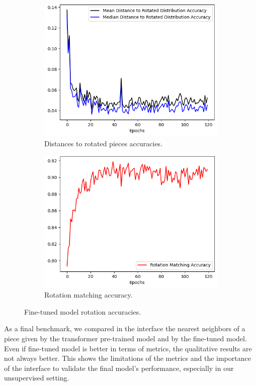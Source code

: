 \begin{figure}[]
    \begin{subfigure}[h]{0.5\linewidth}
        \includegraphics[width=\columnwidth]{images/rotation_metrics_evolution_openshape.png}
        \caption{Distances to rotated pieces accuracies.}
    \end{subfigure}
    \hfill
    \begin{subfigure}[h]{0.5\linewidth}
        \includegraphics[width=\columnwidth]{images/rotation_accuracy_evolution_openshape.png}
        \caption{Rotation matching accuracy.}
    \end{subfigure}
    \caption{Fine-tuned model rotation accuracies.}
    \label{fig:rotation_metrics_evolution_openshape}
\end{figure}

As a final benchmark, we compared in the interface the nearest neighbors of a piece given by the transformer pre-trained model and by the fine-tuned model. Even if fine-tuned model is better in terms of metrics, the qualitative results are not always better. This shows the limitations of the metrics and the importance of the interface to validate the final model's performance, especially in our unsupervised setting.
